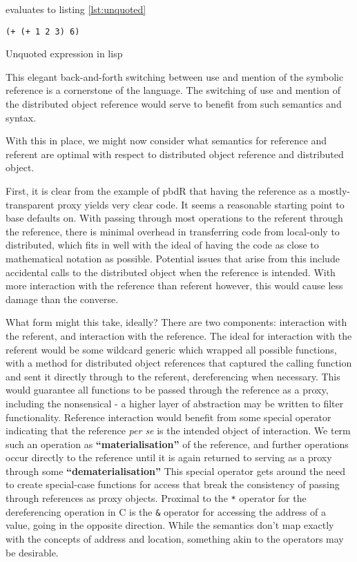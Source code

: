 evaluates to listing \ref{lst:unquoted}

\begin{listing}
    \begin{verbatim}
(+ (+ 1 2 3) 6)
    \end{verbatim}
    \caption{Unquoted expression in lisp}
    \label{lst:unquoted}
\end{listing}


This elegant back-and-forth switching between use and mention of the
symbolic reference is a cornerstone of the language. The switching of
use and mention of the distributed object reference would serve to
benefit from such semantics and syntax.

With this in place, we might now consider what semantics for reference
and referent are optimal with respect to distributed object reference
and distributed object.

First, it is clear from the example of pbdR that having the reference as
a mostly-transparent proxy yields very clear code. It seems a reasonable
starting point to base defaults on. With passing through most operations
to the referent through the reference, there is minimal overhead in
transferring code from local-only to distributed, which fits in well
with the ideal of having the code as close to mathematical notation as
possible. Potential issues that arise from this include accidental calls
to the distributed object when the reference is intended. With more
interaction with the reference than referent however, this would cause
less damage than the converse.

What form might this take, ideally? There are two components:
interaction with the referent, and interaction with the reference. The
ideal for interaction with the referent would be some wildcard generic
which wrapped all possible functions, with a method for distributed
object references that captured the calling function and sent it
directly through to the referent, dereferencing when necessary. This
would guarantee all functions to be passed through the reference as a
proxy, including the nonsensical - a higher layer of abstraction may be
written to filter functionality. Reference interaction would benefit
from some special operator indicating that the reference \emph{per se}
is the intended object of interaction. We term such an operation as
\textbf{``materialisation''} of the reference, and further operations
occur directly to the reference until it is again returned to serving as
a proxy through some \textbf{``dematerialisation''} This special
operator gets around the need to create special-case functions for
access that break the consistency of passing through references as proxy
objects. Proximal to the \texttt{*} operator for the dereferencing
operation in C is the \texttt{\&} operator for accessing the address of
a value, going in the opposite direction. While the semantics don't map
exactly with the concepts of address and location, something akin to the
operators may be desirable.

